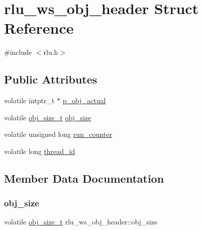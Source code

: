 \hypertarget{structrlu__ws__obj__header}{}\section{rlu\+\_\+ws\+\_\+obj\+\_\+header Struct Reference}
\label{structrlu__ws__obj__header}


{\ttfamily \#include $<$rlu.\+h$>$}

\subsection*{Public Attributes}
\begin{DoxyCompactItemize}
\item 
volatile intptr\+\_\+t $\ast$ \hyperlink{structrlu__ws__obj__header_a2b1254b6486c9a06e783da3cbcb5b319}{p\+\_\+obj\+\_\+actual}
\item 
volatile \hyperlink{rlu_8h_a9d7518ffdaed10a9245b60ec8f59bd15}{obj\+\_\+size\+\_\+t} \hyperlink{structrlu__ws__obj__header_a93e7553811bb248f2af8093c5a7067f7}{obj\+\_\+size}
\item 
volatile unsigned long \hyperlink{structrlu__ws__obj__header_ae6a758ce56333241a21ccfb10d077ff7}{run\+\_\+counter}
\item 
volatile long \hyperlink{structrlu__ws__obj__header_a01eb643ac50f12a6eeb6736a60fd60b9}{thread\+\_\+id}
\end{DoxyCompactItemize}


\subsection{Member Data Documentation}
\mbox{\label{structrlu__ws__obj__header_a93e7553811bb248f2af8093c5a7067f7}} 
\subsubsection{\texorpdfstring{obj\+\_\+size}{obj\_size}}
{\footnotesize\ttfamily volatile \hyperlink{rlu_8h_a9d7518ffdaed10a9245b60ec8f59bd15}{obj\+\_\+size\+\_\+t} rlu\+\_\+ws\+\_\+obj\+\_\+header\+::obj\+\_\+size}

\mbox{\label{structrlu__ws__obj__header_a2b1254b6486c9a06e783da3cbcb5b319}} 
